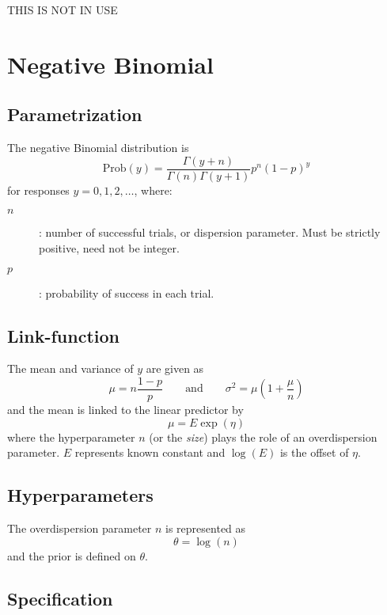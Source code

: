 \documentclass[a4paper,11pt]{article}
\begin{document}
THIS IS NOT IN USE

\section*{Negative Binomial}

\subsection*{Parametrization}

The negative Binomial distribution is
\begin{displaymath}
    \text{Prob}(y) = \frac{\Gamma(y+n)}{\Gamma(n) \Gamma(y+1)} p^n (1-p)^y
\end{displaymath}
for responses $y=0, 1, 2, \ldots$, where:
\begin{description}
\item[$n$]: number of successful trials, or dispersion
    parameter. Must be strictly positive, need not be integer.
\item[$p$]: probability of success in each trial.
\end{description}

\subsection*{Link-function}

The mean and variance of $y$ are given as
\begin{displaymath}
    \mu = n \frac{1-p}{p} \qquad\text{and}\qquad \sigma^{2} = \mu(1 + \frac{\mu}{n})
\end{displaymath}
and the mean is linked to the linear predictor by
\begin{displaymath}
    \mu = E \exp(\eta)
\end{displaymath}
where the hyperparameter $n$ (or the \emph{size}) plays the role of an
overdispersion parameter. $E$ represents known constant and
$\log(E)$ is the offset of $\eta$.

\subsection*{Hyperparameters}

The overdispersion parameter $n$ is represented as
\begin{displaymath}
    \theta = \log(n)
\end{displaymath}
and the prior is defined on $\theta$. 

\subsection*{Specification}
\end{document}

